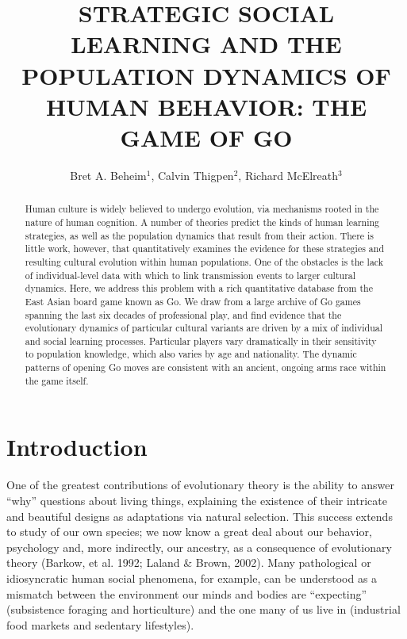 \documentclass{article}
\title{STRATEGIC SOCIAL LEARNING AND THE POPULATION DYNAMICS OF HUMAN BEHAVIOR: THE GAME OF GO}
\author{Bret A. Beheim$^1$, Calvin Thigpen$^2$, Richard McElreath$^3$}
\begin{document}
\maketitle

\begin{abstract}
Human culture is widely believed to undergo evolution, via mechanisms rooted in the nature of human cognition. A number of theories predict the kinds of human learning strategies, as well as the population dynamics that result from their action. There is little work, however, that quantitatively examines the evidence for these strategies and resulting cultural evolution within human populations. One of the obstacles is the lack of individual-level data with which to link transmission events to larger cultural dynamics. Here, we address this problem with a rich quantitative database from the East Asian board game known as Go. We draw from a large archive of Go games spanning the last six decades of professional play, and find evidence that the evolutionary dynamics of particular cultural variants are driven by a mix of individual and social learning processes.  Particular players vary dramatically in their sensitivity to population knowledge, which also varies by age and nationality.  The dynamic patterns of opening Go moves are consistent with an ancient, ongoing arms race within the game itself.
\end{abstract}



\section{Introduction}

One of the greatest contributions of evolutionary theory is the ability to answer ``why'' questions about living things, explaining the existence of their intricate and beautiful designs as adaptations via natural selection.  This success extends to study of our own species; we now know a great deal about our behavior, psychology and, more indirectly, our ancestry, as a consequence of evolutionary theory (Barkow, et al. 1992; Laland \& Brown, 2002).  Many pathological or idiosyncratic human social phenomena, for example, can be understood as a mismatch between the environment our minds and bodies are ``expecting'' (subsistence foraging and horticulture) and the one many of us live in (industrial food markets and sedentary lifestyles).  
\end{document}
